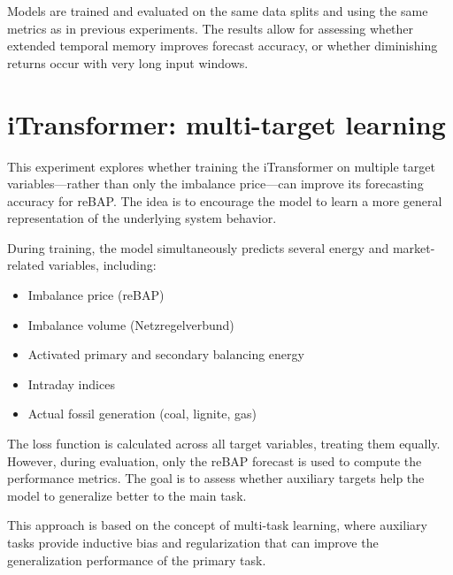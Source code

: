 \documentclass[class=scrbook, crop=false]{standalone}
\begin{document}
Models are trained and evaluated on the same data splits and using the same metrics as in previous experiments. The results allow for assessing whether extended temporal memory improves forecast accuracy, or whether diminishing returns occur with very long input windows.

   

\section{iTransformer: multi-target learning}
This experiment explores whether training the iTransformer on multiple target variables—rather than only the imbalance price—can improve its forecasting accuracy for reBAP. The idea is to encourage the model to learn a more general representation of the underlying system behavior.

During training, the model simultaneously predicts several energy and market-related variables, including:
\begin{itemize}
\item Imbalance price (reBAP)
\item Imbalance volume (Netzregelverbund)
\item Activated primary and secondary balancing energy
\item Intraday indices 
\item Actual fossil generation (coal, lignite, gas)
\end{itemize}

The loss function is calculated across all target variables, treating them equally. However, during evaluation, only the reBAP forecast is used to compute the performance metrics. The goal is to assess whether auxiliary targets help the model to generalize better to the main task.

This approach is based on the concept of multi-task learning, where auxiliary tasks provide inductive bias and regularization that can improve the generalization performance of the primary task.
\end{document}
